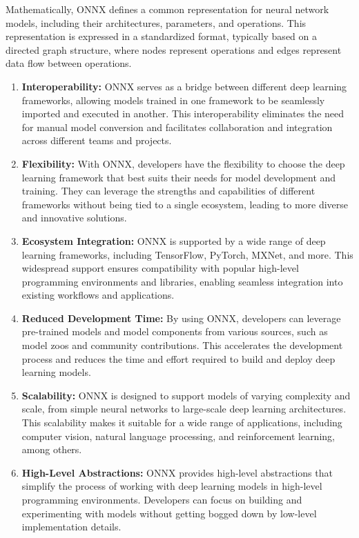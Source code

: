 \documentclass[a4paper]{report}
\begin{document}
{Mathematically, ONNX defines a common representation for neural network models, including their architectures, parameters, and operations. This representation is expressed in a standardized format, typically based on a directed graph structure, where nodes represent operations and edges represent data flow between operations.
\begin{enumerate}[label=\arabic*.]
    \item \textbf{Interoperability:} ONNX serves as a bridge between different deep learning frameworks, allowing models trained in one framework to be seamlessly imported and executed in another. This interoperability eliminates the need for manual model conversion and facilitates collaboration and integration across different teams and projects.
    
    \item \textbf{Flexibility:} With ONNX, developers have the flexibility to choose the deep learning framework that best suits their needs for model development and training. They can leverage the strengths and capabilities of different frameworks without being tied to a single ecosystem, leading to more diverse and innovative solutions.
    
    \item \textbf{Ecosystem Integration:} ONNX is supported by a wide range of deep learning frameworks, including TensorFlow, PyTorch, MXNet, and more. This widespread support ensures compatibility with popular high-level programming environments and libraries, enabling seamless integration into existing workflows and applications.
    
    \item \textbf{Reduced Development Time:} By using ONNX, developers can leverage pre-trained models and model components from various sources, such as model zoos and community contributions. This accelerates the development process and reduces the time and effort required to build and deploy deep learning models.
    
    \item \textbf{Scalability:} ONNX is designed to support models of varying complexity and scale, from simple neural networks to large-scale deep learning architectures. This scalability makes it suitable for a wide range of applications, including computer vision, natural language processing, and reinforcement learning, among others.
    
    \item \textbf{High-Level Abstractions:} ONNX provides high-level abstractions that simplify the process of working with deep learning models in high-level programming environments. Developers can focus on building and experimenting with models without getting bogged down by low-level implementation details.
    \end{enumerate}
}
\end{document}
